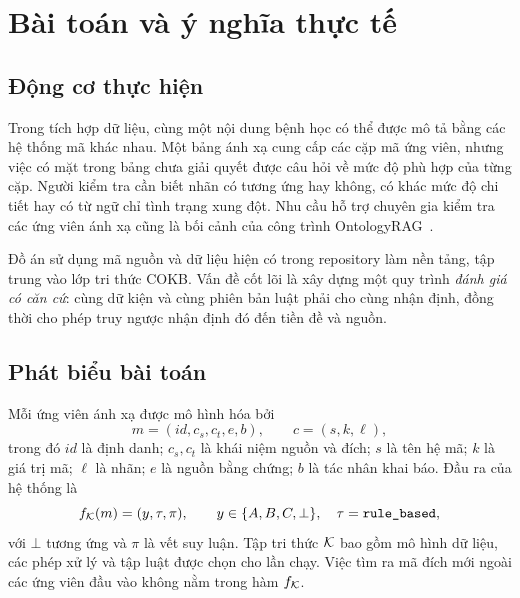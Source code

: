 \chapter{Bài toán và ý nghĩa thực tế}\label{chap:problem}
\section{Động cơ thực hiện}
Trong tích hợp dữ liệu, cùng một nội dung bệnh học có thể được mô tả bằng
các hệ thống mã khác nhau. Một bảng ánh xạ cung cấp các cặp mã ứng viên,
nhưng việc có mặt trong bảng chưa giải quyết được câu hỏi về mức độ phù hợp
của từng cặp. Người kiểm tra cần biết nhãn có tương ứng hay không, có khác
mức độ chi tiết hay có từ ngữ chỉ tình trạng xung đột. Nhu cầu hỗ trợ chuyên
gia kiểm tra các ứng viên ánh xạ cũng là bối cảnh của công trình
OntologyRAG~\cite{ontologyrag2025}.

Đồ án sử dụng mã nguồn và dữ liệu hiện có trong repository làm nền tảng,
tập trung vào lớp tri thức COKB. Vấn đề cốt lõi là xây dựng một quy trình
\emph{đánh giá có căn cứ}: cùng dữ kiện và cùng phiên bản luật phải cho
cùng nhận định, đồng thời cho phép truy ngược nhận định đó đến tiền đề và nguồn.

\section{Phát biểu bài toán}
Mỗi ứng viên ánh xạ được mô hình hóa bởi
\begin{equation}
  m=(id,c_s,c_t,e,b),\qquad c=(s,k,\ell),
  \label{eq:mapping}
\end{equation}
trong đó $id$ là định danh; $c_s,c_t$ là khái niệm nguồn và đích;
$s$ là tên hệ mã; $k$ là giá trị mã; $\ell$ là nhãn;
$e$ là nguồn bằng chứng; $b$ là tác nhân khai báo.
Đầu ra của hệ thống là
\begin{equation}
  f_{\mathcal{K}}(m)=(y,\tau,\pi),\qquad
  y\in\{A,B,C,\bot\},\quad \tau=\texttt{rule\_based},
  \label{eq:task}
\end{equation}
với $\bot$ tương ứng \Unassessed{} và $\pi$ là vết suy luận.
Tập tri thức $\mathcal{K}$ bao gồm mô hình dữ liệu, các phép xử lý và tập luật được
chọn cho lần chạy. Việc tìm ra mã đích mới ngoài các ứng viên đầu vào
không nằm trong hàm $f_{\mathcal{K}}$.

